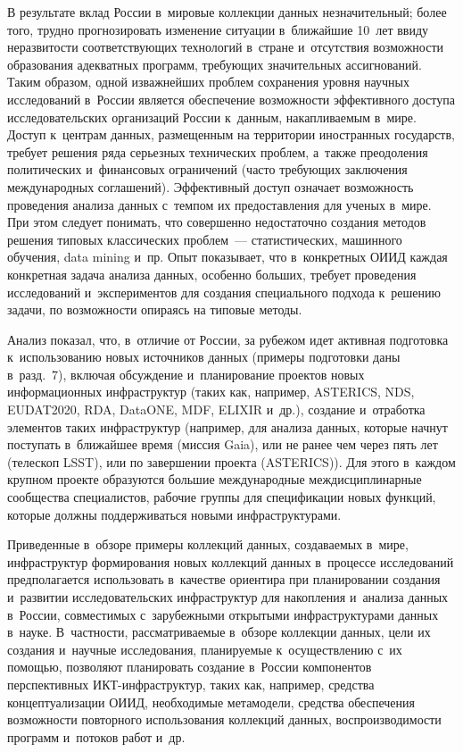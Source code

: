 \begin{multicols}{2}
  В результате вклад России в~мировые коллекции данных незначительный; более того, 
трудно прогнозировать изменение ситуации в~{ближайшие} 10~лет ввиду неразвитости 
соответствующих технологий в~стране и~отсутствия возможности образования адекватных 
программ, тре\-бу\-ющих значительных ассигнований. Таким образом, одной из\linebreak важнейших 
проблем сохранения уровня научных исследований в~России является обеспечение\linebreak 
возможности эффективного доступа исследовательских организаций России к~данным, 
накапливаемым в~мире. Доступ к~центрам данных, размещенным на территории 
иностранных государств, требует решения ряда серьезных технических проблем, а~так\-же 
преодоления политических и~финансовых ограничений (часто требующих заключения 
международных соглашений). Эффективный доступ означает возможность проведения 
анализа данных с~темпом их предоставления для ученых в~мире. При этом следует 
понимать, что совершенно недостаточно создания методов решения типовых классических 
проб\-лем~--- статистических, машинного обучения, data mining и~пр. Опыт показывает, 
что в~конкретных ОИИД каждая конкретная задача анализа данных, особенно больших, 
требует проведения исследований и~экспериментов для создания специального подхода 
к~решению задачи, по возможности опираясь на типовые методы.
  
  Анализ показал, что, в~отличие от России, за рубежом идет активная подготовка 
к~использованию новых источников данных (примеры подготовки даны в~разд.~7), 
включая обсуждение и~планирование проектов новых информационных инфраструктур 
(таких как, например, ASTERICS, NDS, EUDAT2020, RDA, DataONE, MDF, ELIXIR и~др.), 
создание и~отработка элементов таких инфраструктур (например, для анализа данных, 
которые нач\-нут поступать в~ближайшее время (миссия Gaia), или не ранее чем через пять 
лет (телескоп LSST), или по завершении проекта (ASTERICS)). Для этого в~каждом 
крупном проекте образуются большие международные междисциплинарные сообщества 
специалистов, рабочие группы для спецификации новых функций, которые должны 
поддерживаться новыми инфраструктурами.
  
  Приведенные в~обзоре примеры коллекций данных, создаваемых в~мире, инфраструктур 
формирования новых коллекций данных в~процессе исследований предполагается 
использовать в~качестве ориентира при планировании создания и~развитии 
исследовательских инфраструктур для накопления и~анализа данных в~России, 
совместимых с~зарубежными открытыми инфраструктурами данных в~науке. В~частности, 
рассматриваемые в~обзоре коллекции данных, цели их создания и~научные исследования, 
планируемые к~осуществлению с~их помощью, позволяют планировать создание в~России 
компонентов перспективных ИКТ-инфра\-струк\-тур, таких как, например, средства 
концептуализации ОИИД, необходимые метамодели, средства обеспечения возможности 
повторного использования коллекций данных, воспроизводимости программ и~потоков 
работ и~др.
  

\end{multicols}
